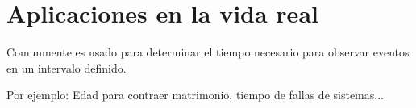 \section{Aplicaciones en la vida real}
Comunmente es usado para determinar el tiempo necesario para observar eventos en un intervalo definido.

Por ejemplo: Edad para contraer matrimonio, tiempo de fallas de sistemas...
